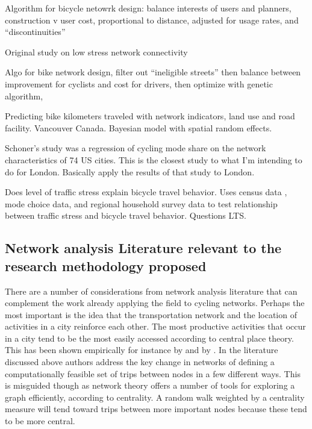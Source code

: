 \documentclass[11pt]{article} %
\begin{document}
Algorithm for bicycle netowrk design: balance interests of users and planners, construction v user cost, proportional to distance, adjusted for usage rates, and ``discontinuities'' 
\cite{mauttone2017bicycle}

Original study on low stress network connectivity
\cite{mekuria2012low}


Algo for bike network design, filter out ``ineligible streets'' then balance between improvement for cyclists and cost for drivers, then optimize with genetic algorithm, 
\cite{mesbah2012bilevel}


Predicting bike kilometers traveled with network indicators, land use and road facility. Vancouver Canada. Bayesian model with spatial random effects. 
\cite{osama2017models}

Schoner's study was a regression of cycling mode share on the network characteristics of 74 US cities. This is the closest study to what I'm intending to do for London. Basically apply the results of that study to London. 
\cite{schoner2014missing}


Does level of traffic stress explain bicycle travel behavior. Uses census data , mode choice data, and regional household survey data to test relationship between traffic stress and bicycle travel behavior. Questions LTS. 
\cite{wang2016does}




\subsection{Network analysis Literature relevant to the research methodology proposed}

There are a number of considerations from network analysis literature that can complement the work already applying the field to cycling networks. Perhaps the most important is the idea that the transportation network and the location of activities in a city reinforce each other. The most productive activities that occur in a city tend to be the most easily accessed according to central place theory. This has been shown empirically for instance by \cite{porta2012street} and by \cite{wang2011street}. In the literature discussed above authors address the key change in networks of defining a computationally feasible set of trips between nodes in a few different ways. This is misguided though as network theory offers a number of tools for exploring a graph efficiently, according to centrality. A random walk weighted by a centrality measure will tend toward trips between more important nodes because these tend to be more central. 
\end{document}
